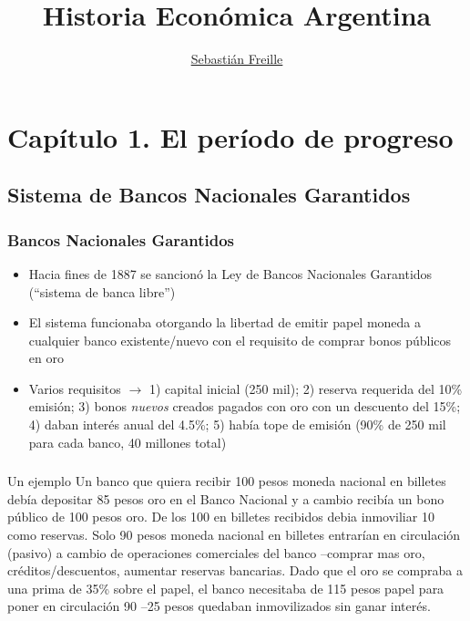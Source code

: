 \documentclass[14pt,aspectratio=169]{beamer}
\title{Historia Económica Argentina}
\author{\underline{Sebastián Freille} \inst{1}}
\institute[shortinst]{\inst{1} IEF-UNC \\ UCC}
\date{}
\begin{document}
{
  \begin{frame}
    \titlepage
  \end{frame}
}

  
  \section{Capítulo 1. El período de progreso}

  \subsection{Sistema de Bancos Nacionales Garantidos}


  \begin{frame}\frametitle{Bancos Nacionales Garantidos}
    \begin{itemize}\itemsep 10pt
      \item Hacia fines de 1887 se sancionó la Ley de Bancos
        Nacionales Garantidos (``sistema de banca libre'') 
\item El sistema funcionaba otorgando la libertad de emitir papel
  moneda a cualquier banco existente/nuevo con el requisito de comprar
  bonos públicos en oro
  \item Varios requisitos $\longrightarrow$ 1)
    capital inicial (250 mil); 2) reserva requerida del 10\% emisión;
    3) bonos \textit{nuevos} creados pagados con oro con un descuento
    del 15\%; 4) daban interés anual del 4.5\%; 5) había tope de
    emisión (90\% de 250 mil para cada banco, 40 millones total)
  \end{itemize}
      \end{frame}


     \begin{frame}\frametitle{}
       \begin{block}{Un ejemplo}
Un banco que quiera recibir 100 pesos moneda nacional en billetes debía depositar 85 pesos
oro en el Banco Nacional y a cambio recibía un bono público de 100
pesos oro. De los 100 en billetes recibidos debia inmoviliar 10 como
reservas. Solo 90 pesos moneda nacional en billetes entrarían en
circulación (pasivo) a cambio de operaciones comerciales del banco
--comprar mas oro, créditos/descuentos, aumentar reservas
bancarias. Dado que el oro se compraba a una prima de 35\% sobre el
papel, el banco necesitaba de 115 pesos papel para poner en
circulación 90 --25 pesos quedaban inmovilizados sin ganar interés.
         \end{block}
       \end{frame}
\end{document}
